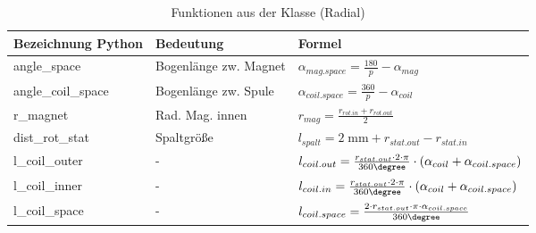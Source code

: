 \begin{table}[h!]

\centering
\caption{Funktionen aus der Klasse (Radial)}
\label{tab:class.rad}
\renewcommand{\arraystretch}{2}
\setlength{\tabcolsep}{5mm}

\begin{tabular}{lll}
    \toprule
     Bezeichnung Python & Bedeutung& Formel\\
    \midrule
	angle\_space &Bogenlänge zw. Magnet&$\alpha_ {mag.space} = \frac{180}{p} - \alpha_{mag}$\\
	angle\_coil\_space &Bogenlänge zw. Spule&$\alpha_{coil.space} = \frac{360}{p} -  \alpha_{coil}$\\
	r\_magnet &Rad. Mag. innen&$r_{mag} = \frac{r_{rot.in} + r_{rot.out}}{2}$\\
  dist\_rot\_stat &Spaltgröße&$l_{spalt}= 2\; \text{mm} + r_{stat.out} - r_{stat.in}$\\
  l\_coil\_outer &-&$l_{coil.out}=\frac{r_{stat.out} \cdot 2 \cdot \pi }{360 \degree} \cdot (\alpha_{coil} + \alpha_{coil.space})$\\
  l\_coil\_inner &-&$l_{coil.in}=\frac{r_{stat.out} \cdot 2 \cdot \pi }{360 \degree} \cdot (\alpha_{coil} + \alpha_{coil.space})$\\
  l\_coil\_space &-&$l_{coil.space}= \frac{2 \cdot r_{stat.out} \cdot \pi \cdot \alpha_{coil.space}}{360 \degree}$\\
 
	

    \bottomrule
  \end{tabular}
\end{table}

\newpage

